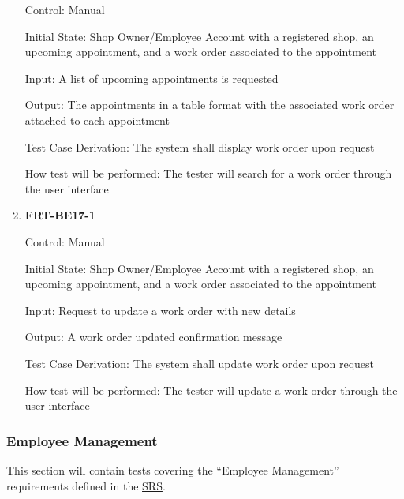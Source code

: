 \documentclass[12pt, titlepage]{article}
\begin{document}
\begin{enumerate}
	      Control: Manual

	      Initial State: Shop Owner/Employee Account with a registered shop, an upcoming appointment, and a
	      work order associated to the appointment

	      Input: A list of upcoming appointments is requested

	      Output: The appointments in a table format with the associated work order attached to each
	      appointment

	      Test Case Derivation: The system shall display work order upon request

	      How test will be performed: The tester will search for a work order through the user interface

	\item \textbf{FRT-BE17-1}

	      Control: Manual

	      Initial State: Shop Owner/Employee Account with a registered shop, an upcoming appointment, and a
	      work order associated to the appointment

	      Input: Request to update a work order with new details

	      Output: A work order updated confirmation message

	      Test Case Derivation: The system shall update work order upon request

	      How test will be performed: The tester will update a work order through the user interface

\end{enumerate}

\subsubsection{Employee Management}

This section will contain tests covering the ``Employee Management'' requirements defined in the
\href{https://github.com/arkinmodi/project-sayyara/blob/main/docs/SRS/SRS.pdf}{SRS}.
\end{document}
